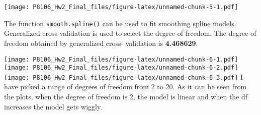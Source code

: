 \documentclass[]{article}
\newenvironment{Shaded}{\begin{snugshade}}{\end{snugshade}}
\newcommand{\CommentTok}[1]{\textcolor[rgb]{0.56,0.35,0.01}{\textit{#1}}}
\newcommand{\ControlFlowTok}[1]{\textcolor[rgb]{0.13,0.29,0.53}{\textbf{#1}}}
\newcommand{\DataTypeTok}[1]{\textcolor[rgb]{0.13,0.29,0.53}{#1}}
\newcommand{\DecValTok}[1]{\textcolor[rgb]{0.00,0.00,0.81}{#1}}
\newcommand{\FloatTok}[1]{\textcolor[rgb]{0.00,0.00,0.81}{#1}}
\newcommand{\KeywordTok}[1]{\textcolor[rgb]{0.13,0.29,0.53}{\textbf{#1}}}
\newcommand{\NormalTok}[1]{#1}
\newcommand{\OperatorTok}[1]{\textcolor[rgb]{0.81,0.36,0.00}{\textbf{#1}}}
\newcommand{\OtherTok}[1]{\textcolor[rgb]{0.56,0.35,0.01}{#1}}
\newcommand{\StringTok}[1]{\textcolor[rgb]{0.31,0.60,0.02}{#1}}
\begin{document}
\texttt{[image: P8106\_Hw2\_Final\_files/figure-latex/unnamed-chunk-5-1.pdf]}

The function \texttt{smooth.spline()} can be used to fit smoothing
spline models. Generalized cross-validation is used to select the degree
of freedom. The degree of freedom obtained by generalized cross-
validation is \textbf{4.468629}.

\begin{Shaded}
\end{Shaded}

\texttt{[image: P8106\_Hw2\_Final\_files/figure-latex/unnamed-chunk-6-1.pdf]}
\texttt{[image: P8106\_Hw2\_Final\_files/figure-latex/unnamed-chunk-6-2.pdf]}
\texttt{[image: P8106\_Hw2\_Final\_files/figure-latex/unnamed-chunk-6-3.pdf]}
I have picked a range of degrees of freedom from 2 to 20. As it can be
seen from the plots, when the degree of freedom is 2, the model is
linear and when the df increases the model gets wiggly.
\end{document}
